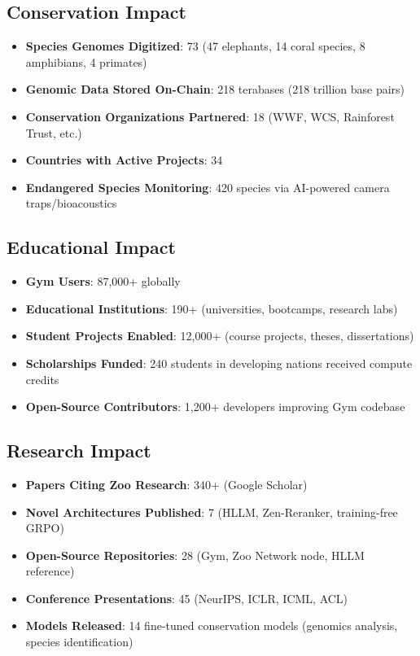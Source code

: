 \documentclass[twocolumn,11pt]{article}
\begin{document}
\subsection{Conservation Impact}

\begin{itemize}
    \item \textbf{Species Genomes Digitized}: 73 (47 elephants, 14 coral species, 8 amphibians, 4 primates)
    \item \textbf{Genomic Data Stored On-Chain}: 218 terabases (218 trillion base pairs)
    \item \textbf{Conservation Organizations Partnered}: 18 (WWF, WCS, Rainforest Trust, etc.)
    \item \textbf{Countries with Active Projects}: 34
    \item \textbf{Endangered Species Monitoring}: 420 species via AI-powered camera traps/bioacoustics
\end{itemize}

\subsection{Educational Impact}

\begin{itemize}
    \item \textbf{Gym Users}: 87,000+ globally
    \item \textbf{Educational Institutions}: 190+ (universities, bootcamps, research labs)
    \item \textbf{Student Projects Enabled}: 12,000+ (course projects, theses, dissertations)
    \item \textbf{Scholarships Funded}: 240 students in developing nations received compute credits
    \item \textbf{Open-Source Contributors}: 1,200+ developers improving Gym codebase
\end{itemize}

\subsection{Research Impact}

\begin{itemize}
    \item \textbf{Papers Citing Zoo Research}: 340+ (Google Scholar)
    \item \textbf{Novel Architectures Published}: 7 (HLLM, Zen-Reranker, training-free GRPO)
    \item \textbf{Open-Source Repositories}: 28 (Gym, Zoo Network node, HLLM reference)
    \item \textbf{Conference Presentations}: 45 (NeurIPS, ICLR, ICML, ACL)
    \item \textbf{Models Released}: 14 fine-tuned conservation models (genomics analysis, species identification)
\end{itemize}
\end{document}
